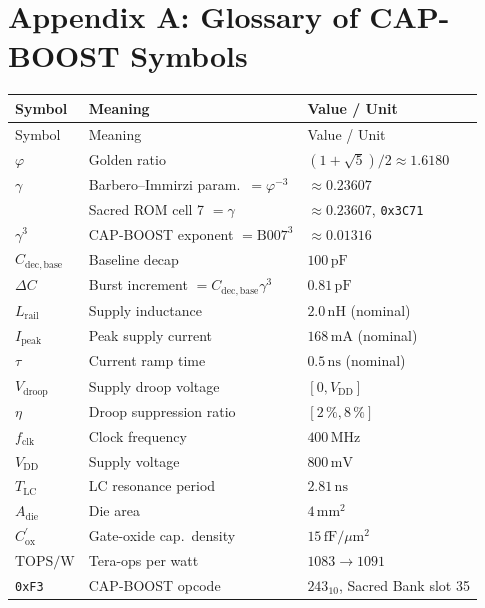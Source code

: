 \documentclass[12pt,a4paper]{report}
\theoremstyle{plain}
\theoremstyle{definition}
\theoremstyle{remark}
\newcommand{\Vdd}{V_{\mathrm{DD}}}
\newcommand{\Vdroop}{V_{\mathrm{droop}}}
\newcommand{\Lrail}{L_{\mathrm{rail}}}
\newcommand{\Cbase}{C_{\mathrm{dec,base}}}
\newcommand{\deltaC}{\Delta C}
\newcommand{\Ipeak}{I_{\mathrm{peak}}}
\newcommand{\fclk}{f_{\mathrm{clk}}}
\newcommand{\TOPSW}{\mathrm{TOPS/W}}
\newcommand{\Bseven}{\mathrm{B007}}
\begin{document}
\section*{Appendix A: Glossary of CAP-BOOST Symbols}
\label{sec:appendix-glossary}

\begin{center}
\begin{longtable}{lll}
  \toprule
  Symbol & Meaning & Value / Unit \\
  \midrule
  \endfirsthead
  \toprule
  Symbol & Meaning & Value / Unit \\
  \midrule
  \endhead
  $\varphi$ & Golden ratio & $(1+\sqrt{5})/2 \approx 1.6180$ \\
  $\gamma$ & Barbero--Immirzi param.\ $= \varphi^{-3}$ & $\approx 0.23607$ \\
  \Bseven & Sacred ROM cell 7 $= \gamma$ & $\approx 0.23607$, \texttt{0x3C71} \\
  $\gamma^{3}$ & CAP-BOOST exponent $= \Bseven^{3}$ & $\approx 0.01316$ \\
  $\Cbase$ & Baseline decap & $100\,\mathrm{pF}$ \\
  $\deltaC$ & Burst increment $= \Cbase\gamma^{3}$ & $0.81\,\mathrm{pF}$ \\
  $\Lrail$ & Supply inductance & $2.0\,\mathrm{nH}$ (nominal) \\
  $\Ipeak$ & Peak supply current & $168\,\mathrm{mA}$ (nominal) \\
  $\tau$ & Current ramp time & $0.5\,\mathrm{ns}$ (nominal) \\
  $\Vdroop$ & Supply droop voltage & $[0, \Vdd]$ \\
  $\eta$ & Droop suppression ratio & $[2\,\%, 8\,\%]$ \\
  $\fclk$ & Clock frequency & $400\,\mathrm{MHz}$ \\
  $\Vdd$ & Supply voltage & $800\,\mathrm{mV}$ \\
  $T_{\mathrm{LC}}$ & LC resonance period & $2.81\,\mathrm{ns}$ \\
  $A_{\mathrm{die}}$ & Die area & $4\,\mathrm{mm}^{2}$ \\
  $C_{\mathrm{ox}}^{\prime}$ & Gate-oxide cap.\ density & $15\,\mathrm{fF}/\mu\mathrm{m}^{2}$ \\
  $\TOPSW$ & Tera-ops per watt & $1083 \to 1091$ \\
  \texttt{0xF3} & CAP-BOOST opcode & $243_{10}$, Sacred Bank slot 35 \\
  \bottomrule
\end{longtable}
\end{center}
\end{document}
